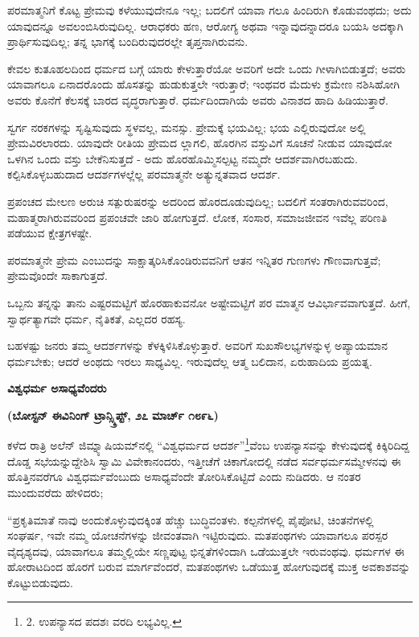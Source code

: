 ಪರಮಾತ್ಮನಿಗೆ ಕೊಟ್ಟ ಪ್ರೇಮವು ಕಳೆಯುವುದೇನೂ ಇಲ್ಲ; ಬದಲಿಗೆ ಯಾವಾ ಗಲೂ ಹಿಂದಿರುಗಿ ಕೊಡುವಂಥದು; ಅದು ಯಾವುದನ್ನೂ ಅವಲಂಬಿಸಿರುವುದಿಲ್ಲ. ಆರಾಧಕರು ಹಣ, ಆರೋಗ್ಯ ಅಥವಾ ಇನ್ನಾವುದನ್ನಾದರೂ ಬಯಸಿ ಅದಕ್ಕಾಗಿ ಪ್ರಾರ್ಥಿಸುವುದಿಲ್ಲ; ತನ್ನ ಭಾಗಕ್ಕೆ ಬಂದಿರುವುದರಲ್ಲೇ ತೃಪ್ತನಾಗಿರುವನು.

ಕೇವಲ ಕುತೂಹಲದಿಂದ ಧರ್ಮದ ಬಗ್ಗೆ ಯಾರು ಕೇಳುತ್ತಾರೆಯೋ ಅವರಿಗೆ ಅದೇ ಒಂದು ಗೀಳಾಗಿಬಿಡುತ್ತದೆ; ಅವರು ಯಾವಾಗಲೂ ಏನಾದರೊಂದು ಹೊಸತನ್ನು ಹುಡುಕುತ್ತಲೇ ಇರುತ್ತಾರೆ; ಇಂಥವರ ಮೆದುಳು ಕ್ರಮೇಣ ನಶಿಸಿಹೋಗಿ ಅವರು ಕೊನೆಗೆ ಕೆಲಸಕ್ಕೆ ಬಾರದ ವೃದ್ಧರಾಗುತ್ತಾರೆ. ಧರ್ಮದಿಂದಾಗಿಯೆ ಅವರು ವಿನಾಶದ ಹಾದಿ ಹಿಡಿಯುತ್ತಾರೆ.

ಸ್ವರ್ಗ ನರಕಗಳನ್ನು ಸೃಷ್ಟಿಸುವುದು ಸ್ಥಳವಲ್ಲ, ಮನಸ್ಸು. ಪ್ರೇಮಕ್ಕೆ ಭಯವಿಲ್ಲ; ಭಯ ಎಲ್ಲಿರುವುದೋ ಅಲ್ಲಿ ಪ್ರೇಮವಿರಲಾರದು. ಯಾವುದೇ ರೀತಿಯ ಪ್ರೇಮದ ಲ್ಲಾಗಲಿ, ಹೊರಗಿನ ವಸ್ತುವಿಗೆ ಸೂಚನೆ ನೀಡುವ ಯಾವುದೋ ಒಳಗಿನ ಒಂದು ವಸ್ತು ಬೇಕೆನಿಸುತ್ತದೆ - ಅದು ಹೊರಹೊಮ್ಮಿಸಲ್ಪಟ್ಟ ನಮ್ಮದೇ ಆದರ್ಶವಾಗಿರಬಹುದು. ಕಲ್ಪಿಸಿಕೊಳ್ಳಬಹುದಾದ ಆದರ್ಶಗಳಲ್ಲೆಲ್ಲ ಪರಮಾತ್ಮನೇ ಅತ್ಯುನ್ನತವಾದ ಆದರ್ಶ.

ಪ್ರಪಂಚದ ಮೇಲಣ ಅರುಚಿ ಸತ್ಪುರುಷರನ್ನು ಅದರಿಂದ ಹೊರದೂಡುವುದಿಲ್ಲ; ಬದಲಿಗೆ ಸಂತರಾಗಿರುವವರಿಂದ, ಮಹಾತ್ಮರಾಗಿರುವವರಿಂದ ಪ್ರಪಂಚವೇ ಜಾರಿ ಹೋಗುತ್ತದೆ. ಲೋಕ, ಸಂಸಾರ, ಸಮಾಜಜೀವನ ಇವೆಲ್ಲ ಪರಿಣತಿ ಪಡೆಯುವ ಕ್ಷೇತ್ರಗಳಷ್ಟೇ.

ಪರಮಾತ್ಮನೇ ಪ್ರೇಮ ಎಂಬುದನ್ನು ಸಾಕ್ಷಾತ್ಕರಿಸಿಕೊಂಡಿರುವವನಿಗೆ ಆತನ ಇನ್ನಿತರ ಗುಣಗಳು ಗೌಣವಾಗುತ್ತವೆ; ಪ್ರೇಮವೊಂದೇ ಸಾಕಾಗುತ್ತದೆ.

ಒಬ್ಬನು ತನ್ನನ್ನು ತಾನು ಎಷ್ಟರಮಟ್ಟಿಗೆ ಹೊರಹಾಕುವನೋ ಅಷ್ಟೇಮಟ್ಟಿಗೆ ಪರ ಮಾತ್ಮನ ಆವಿರ್ಭಾವವಾಗುತ್ತದೆ. ಹೀಗೆ, ಸ್ವಾರ್ಥತ್ಯಾಗವೇ ಧರ್ಮ, ನೈತಿಕತೆ, ಎಲ್ಲದರ ರಹಸ್ಯ.

ಬಹಳಷ್ಟು ಜನರು ತಮ್ಮ ಆದರ್ಶಗಳನ್ನು ಕೆಳಕ್ಕಿಳಿಸಿಕೊಳ್ಳುತ್ತಾರೆ. ಅವರಿಗೆ ಸುಖಸೌಲಭ್ಯಗಳನ್ನುಳ್ಳ ಅಪ್ಯಾಯಮಾನ ಧರ್ಮಬೇಕು; ಆದರೆ ಅಂಥದು ಇರಲು ಸಾಧ್ಯವಿಲ್ಲ. ಇರುವುದೆಲ್ಲ ಆತ್ಮ ಬಲಿದಾನ, ಏರುಹಾದಿಯ ಪ್ರಯತ್ನ.

\begin{center}
\textbf{ವಿಶ್ವಧರ್ಮ ಅಸಾಧ್ಯವೆಂದರು}
\end{center}

\begin{center}
\textbf{(ಬೋಸ್ಟನ್ ಈವಿನಿಂಗ್ ಟ್ರಾನ್ಸ್ಕ್ರಿಪ್ಟ್, ೨೭ ಮಾರ್ಚ್ ೧೮೯೬)}
\end{center}

ಕಳೆದ ರಾತ್ರಿ ಅಲೆನ್ ಜಿಮ್ನ್ಯಾಷಿಯಮ್​ನಲ್ಲಿ “ವಿಶ್ವಧರ್ಮದ ಆದರ್ಶ”\footnote{2. ಉಪನ್ಯಾಸದ ಪದಶಃ ವರದಿ ಲಭ್ಯವಿಲ್ಲ.}ವೆಂಬ ಉಪನ್ಯಾಸವನ್ನು ಕೇಳುವುದಕ್ಕೆ ಕಿಕ್ಕಿರಿದಿದ್ದ ದೊಡ್ಡ ಸಭೆಯನ್ನುದ್ದೇಶಿಸಿ ಸ್ವಾಮಿ ವಿವೇಕಾನಂದರು, ಇತ್ತೀಚೆಗೆ ಚಿಕಾಗೋದಲ್ಲಿ ನಡೆದ ಸರ್ವಧರ್ಮಸಮ್ಮೇಳನವು ಈ ಹೊತ್ತಿನವರೆಗೂ ವಿಶ್ವಧರ್ಮವೆಂಬುದು ಅಸಾಧ್ಯವೆಂದೇ ತೋರಿಸಿಕೊಟ್ಟಿದೆ ಎಂದು ನುಡಿದರು. ಆ ನಂತರ ಮುಂದುವರೆದು ಹೇಳಿದರು;

“ಪ್ರಕೃತಿಮಾತೆ ನಾವು ಅಂದುಕೊಳ್ಳುವುದಕ್ಕಿಂತ ಹೆಚ್ಚು ಬುದ್ಧಿವಂತಳು. ಕಲ್ಪನೆಗಳಲ್ಲಿ ಪೈಪೋಟಿ, ಚಿಂತನೆಗಳಲ್ಲಿ ಸಂಘರ್ಷ, ಇವೇ ನಮ್ಮ ಯೋಚನೆಗಳನ್ನು ಜೀವಂತವಾಗಿ ಇಟ್ಟಿರುವುದು. ಮತಪಂಥಗಳು ಯಾವಾಗಲೂ ಪರಸ್ಪರ ವೈದೃಶ್ಯದವು, ಯಾವಾಗಲೂ ತಮ್ಮಲ್ಲಿಯೇ ಸಣ್ಣಪುಟ್ಟ ಭಿನ್ನತೆಗಳಿಂದಾಗಿ ಒಡೆಯುತ್ತಲೇ ಇರುವಂಥವು. ಧರ್ಮಗಳ ಈ ಹೋರಾಟದಿಂದ ಹೊರಗೆ ಬರುವ ಮಾರ್ಗವೆಂದರೆ, ಮತಪಂಥಗಳು ಒಡೆಯುತ್ತ ಹೋಗುವುದಕ್ಕೆ ಮುಕ್ತ ಅವಕಾಶವನ್ನು ಕೊಟ್ಟುಬಿಡುವುದು.

